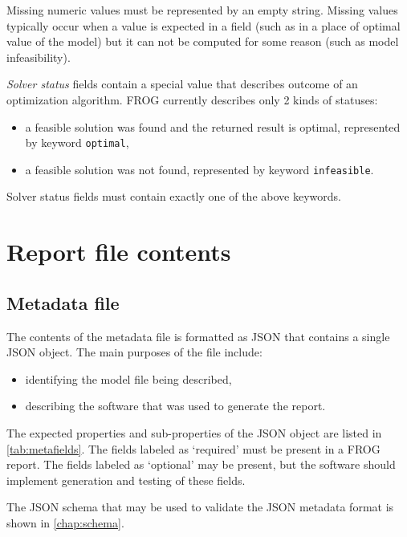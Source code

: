 Missing numeric values must be represented by an empty string. Missing values typically occur when a value is expected in a field (such as in a place of optimal value of the model) but it can not be computed for some reason (such as model infeasibility).

\emph{Solver status} fields contain a special value that describes outcome of an optimization algorithm. FROG currently describes only 2 kinds of statuses:
\begin{itemize}
\item a feasible solution was found and the returned result is optimal, represented by keyword \verb|optimal|,
\item a feasible solution was not found, represented by keyword \verb|infeasible|.
\end{itemize}
Solver status fields must contain exactly one of the above keywords.

\section{Report file contents}

\subsection{Metadata file}
\label{sec:meta}

The contents of the metadata file is formatted as JSON that contains a single JSON object. The main purposes of the file include:
\begin{itemize}
\item identifying the model file being described,
\item describing the software that was used to generate the report.
\end{itemize}

The expected properties and sub-properties of the JSON object are listed in \cref{tab:metafields}. The fields labeled as `required' must be present in a FROG report. The fields labeled as `optional' may be present, but the software should implement generation and testing of these fields.

The JSON schema that may be used to validate the JSON metadata format is shown in \cref{chap:schema}.

